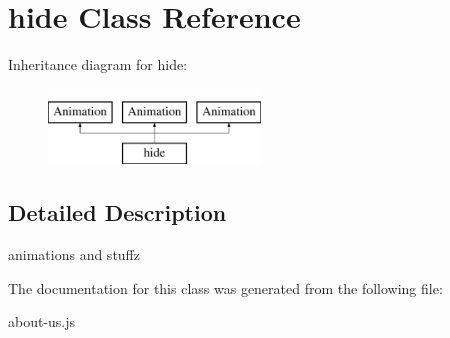 \hypertarget{classhide}{\section{hide Class Reference}
\label{classhide}
}
Inheritance diagram for hide\-:\begin{figure}[H]
\begin{center}
\leavevmode
\includegraphics[height=2.000000cm]{classhide}
\end{center}
\end{figure}


\subsection{Detailed Description}
animations and stuffz 

The documentation for this class was generated from the following file\-:\begin{DoxyCompactItemize}
\item 
about-\/us.\-js\end{DoxyCompactItemize}

